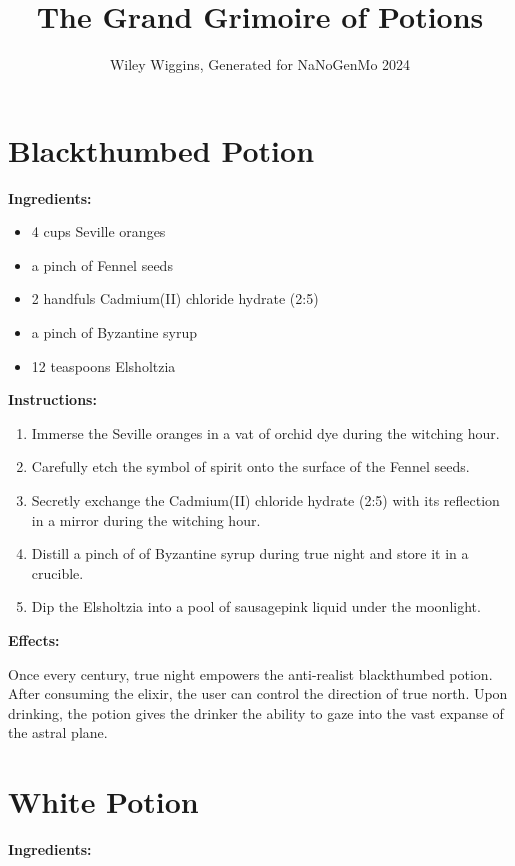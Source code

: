 \documentclass{article}
\title{The Grand Grimoire of Potions}
\author{Wiley Wiggins, Generated for NaNoGenMo 2024}
\date{}
\begin{document}
\maketitle

\newpage
\section*{Blackthumbed Potion}

\textbf{Ingredients:}

\begin{itemize}
  \item 4 cups Seville oranges
  \item a pinch of Fennel seeds
  \item 2 handfuls Cadmium(II) chloride hydrate (2:5)
  \item a pinch of Byzantine syrup
  \item 12 teaspoons Elsholtzia
\end{itemize}

\textbf{Instructions:}

\begin{enumerate}
  \item Immerse the Seville oranges in a vat of orchid dye during the witching hour.
  \item Carefully etch the symbol of spirit onto the surface of the Fennel seeds.
  \item Secretly exchange the Cadmium(II) chloride hydrate (2:5) with its reflection in a mirror during the witching hour.
  \item Distill a pinch of of Byzantine syrup during true night and store it in a crucible.
  \item Dip the Elsholtzia into a pool of sausagepink liquid under the moonlight.
\end{enumerate}

\textbf{Effects:}

Once every century, true night empowers the anti-realist blackthumbed potion. After consuming the elixir, the user can control the direction of true north. Upon drinking, the potion gives the drinker the ability to gaze into the vast expanse of the astral plane.

\newpage
\section*{White Potion}

\textbf{Ingredients:}
\end{document}
